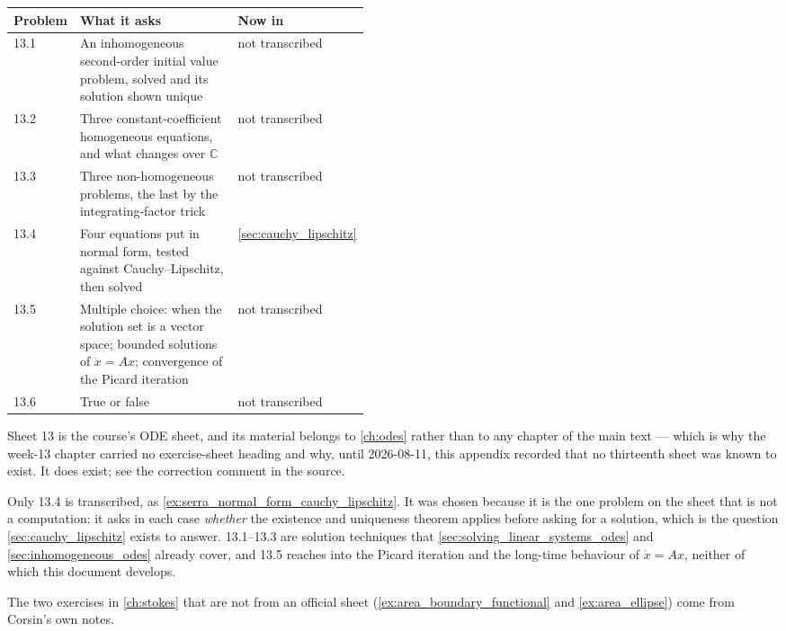 \begin{center}
\begin{tabular}{@{}l p{0.46\linewidth} l@{}}
\textbf{Problem} & \textbf{What it asks} & \textbf{Now in} \\
\hline
13.1 & An inhomogeneous second-order initial value problem, solved and its solution shown
  unique & not transcribed \\[3pt]
13.2 & Three constant-coefficient homogeneous equations, and what changes over $\mathbb{C}$
  & not transcribed \\[3pt]
13.3 & Three non-homogeneous problems, the last by the integrating-factor trick
  & not transcribed \\[3pt]
13.4 & Four equations put in normal form, tested against Cauchy--Lipschitz, then solved
  & \cref{sec:cauchy_lipschitz} \\[3pt]
13.5 & Multiple choice: when the solution set is a vector space; bounded solutions of
  $\dot x = Ax$; convergence of the Picard iteration & not transcribed \\[3pt]
13.6 & True or false & not transcribed \\
\end{tabular}
\end{center}

\begin{ainote}
Sheet 13 is the course's ODE sheet, and its material belongs to \cref{ch:odes} rather than to any
chapter of the main text --- which is why the week-13 chapter carried no exercise-sheet heading and
why, until 2026-08-11, this appendix recorded that no thirteenth sheet was known to exist. It does
exist; see the correction comment in the source.

Only 13.4 is transcribed, as \cref{ex:serra_normal_form_cauchy_lipschitz}. It was chosen because it
is the one problem on the sheet that is not a computation: it asks in each case \emph{whether} the
existence and uniqueness theorem applies before asking for a solution, which is the question
\cref{sec:cauchy_lipschitz} exists to answer. 13.1--13.3 are solution techniques that
\cref{sec:solving_linear_systems_odes} and \cref{sec:inhomogeneous_odes} already cover, and 13.5
reaches into the Picard iteration and the long-time behaviour of $\dot x = Ax$, neither of which
this document develops.

The two exercises in \cref{ch:stokes} that are not from an official sheet
(\cref{ex:area_boundary_functional} and \cref{ex:area_ellipse}) come from Corsin's own notes.
\end{ainote}
